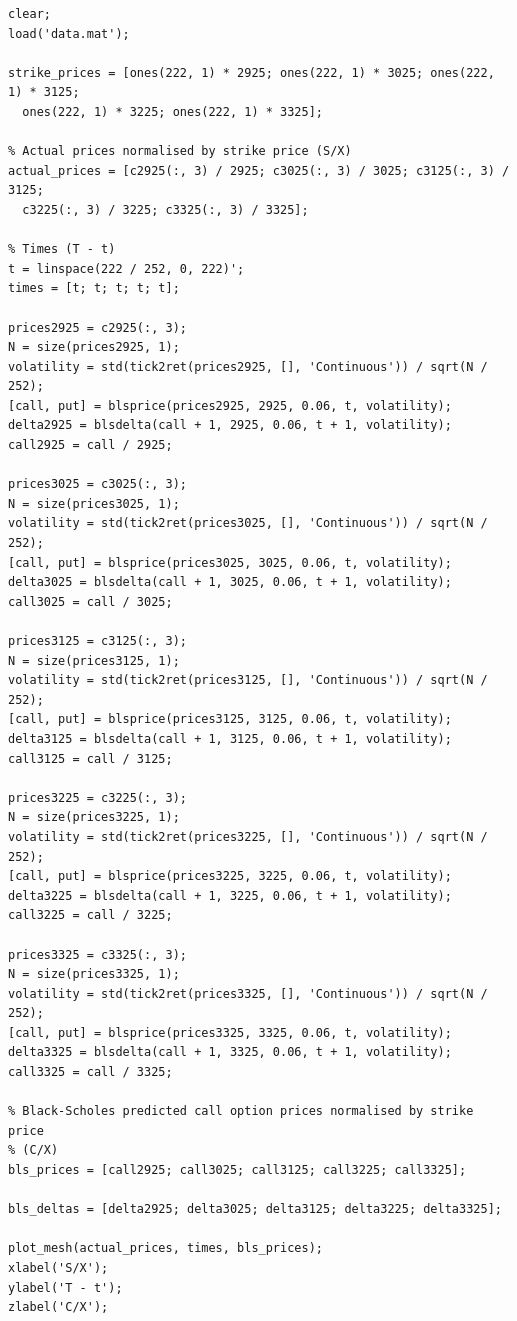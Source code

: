 \documentclass[12pt]{article}
\begin{document}
  \begin{verbatim}
clear;
load('data.mat');

strike_prices = [ones(222, 1) * 2925; ones(222, 1) * 3025; ones(222, 1) * 3125;
  ones(222, 1) * 3225; ones(222, 1) * 3325];

% Actual prices normalised by strike price (S/X)
actual_prices = [c2925(:, 3) / 2925; c3025(:, 3) / 3025; c3125(:, 3) / 3125;
  c3225(:, 3) / 3225; c3325(:, 3) / 3325];

% Times (T - t)
t = linspace(222 / 252, 0, 222)';
times = [t; t; t; t; t];

prices2925 = c2925(:, 3);
N = size(prices2925, 1);
volatility = std(tick2ret(prices2925, [], 'Continuous')) / sqrt(N / 252);
[call, put] = blsprice(prices2925, 2925, 0.06, t, volatility);
delta2925 = blsdelta(call + 1, 2925, 0.06, t + 1, volatility);
call2925 = call / 2925;

prices3025 = c3025(:, 3);
N = size(prices3025, 1);
volatility = std(tick2ret(prices3025, [], 'Continuous')) / sqrt(N / 252);
[call, put] = blsprice(prices3025, 3025, 0.06, t, volatility);
delta3025 = blsdelta(call + 1, 3025, 0.06, t + 1, volatility);
call3025 = call / 3025;

prices3125 = c3125(:, 3);
N = size(prices3125, 1);
volatility = std(tick2ret(prices3125, [], 'Continuous')) / sqrt(N / 252);
[call, put] = blsprice(prices3125, 3125, 0.06, t, volatility);
delta3125 = blsdelta(call + 1, 3125, 0.06, t + 1, volatility);
call3125 = call / 3125;

prices3225 = c3225(:, 3);
N = size(prices3225, 1);
volatility = std(tick2ret(prices3225, [], 'Continuous')) / sqrt(N / 252);
[call, put] = blsprice(prices3225, 3225, 0.06, t, volatility);
delta3225 = blsdelta(call + 1, 3225, 0.06, t + 1, volatility);
call3225 = call / 3225;

prices3325 = c3325(:, 3);
N = size(prices3325, 1);
volatility = std(tick2ret(prices3325, [], 'Continuous')) / sqrt(N / 252);
[call, put] = blsprice(prices3325, 3325, 0.06, t, volatility);
delta3325 = blsdelta(call + 1, 3325, 0.06, t + 1, volatility);
call3325 = call / 3325;

% Black-Scholes predicted call option prices normalised by strike price
% (C/X)
bls_prices = [call2925; call3025; call3125; call3225; call3325];

bls_deltas = [delta2925; delta3025; delta3125; delta3225; delta3325];

plot_mesh(actual_prices, times, bls_prices);
xlabel('S/X');
ylabel('T - t');
zlabel('C/X');


\end{verbatim}
\end{document}
